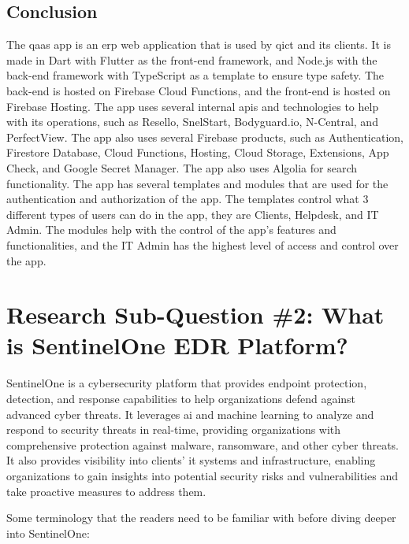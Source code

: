 \begin{multicols}{2}
      \subsection{Conclusion}
      The \acrshort{qaas} app is an \acrshort{erp} web application that is used by \acrshort{qict} and its clients.
      It is made in Dart with Flutter as the front-end framework, and Node.js with the back-end  framework with
      TypeScript as a template to ensure type safety. The back-end is hosted on Firebase Cloud Functions, and the
      front-end is hosted on Firebase Hosting. The app uses several internal \acrshort{api}s and technologies to
      help with its operations, such as Resello, SnelStart, Bodyguard.io, N-Central, and PerfectView. The app also
      uses several Firebase products, such as Authentication, Firestore Database, Cloud Functions, Hosting, Cloud
      Storage, Extensions, App Check, and Google Secret Manager. The app also uses Algolia for search functionality. The app
      has several templates and modules that are used for the authentication and authorization of the app.
      The templates control what 3 different types of users can do in the app, they are Clients, Helpdesk, and IT
      Admin. The modules help with the control of the app's features and functionalities, and the IT Admin has the
      highest level of access and control over the app.

      \section{Research Sub-Question \#2: What is SentinelOne EDR Platform?}

      SentinelOne is a cybersecurity platform that provides endpoint protection, detection, and response capabilities to
      help organizations defend against advanced cyber threats. It leverages \acrlong{ai} and machine learning to analyze
      and respond to security threats in real-time, providing organizations with comprehensive protection against malware,
      ransomware, and other cyber threats. It also provides visibility into clients' \acrshort{it} systems and infrastructure,
      enabling organizations to gain insights into potential security risks and vulnerabilities and take proactive measures
      to address them.

      Some terminology that the readers need to be familiar with before diving deeper into SentinelOne:


\end{multicols}
